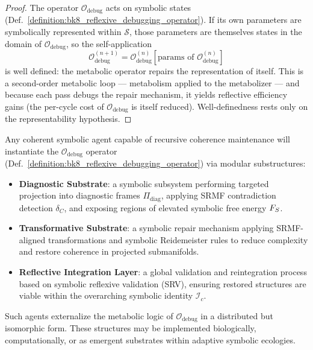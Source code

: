 \begin{proof}
\label{proof:bk8_resursive_self_tuning}
\leavevmode
The operator $\mathcal{O}_{\mathrm{debug}}$ acts on symbolic states (Def.~\ref{definition:bk8_reflexive_debugging_operator}). If its own parameters are symbolically represented within $\mathcal{S}$, those parameters are themselves states in the domain of $\mathcal{O}_{\mathrm{debug}}$, so the self-application
\[
\mathcal{O}^{(n+1)}_{\mathrm{debug}}=\mathcal{O}^{(n)}_{\mathrm{debug}}[\text{params of }\mathcal{O}^{(n)}_{\mathrm{debug}}]
\]
is well defined: the metabolic operator repairs the representation of itself. This is a second-order metabolic loop --- metabolism applied to the metabolizer --- and because each pass debugs the repair mechanism, it yields reflective efficiency gains (the per-cycle cost of $\mathcal{O}_{\mathrm{debug}}$ is itself reduced). Well-definedness rests only on the representability hypothesis.
\end{proof}
\begin{corollary}
\label{corollary:bk8_symbolic_agents_as_projections}
Any coherent symbolic agent capable of recursive coherence maintenance will instantiate the $\mathcal{O}_{\mathrm{debug}}$ operator (Def.~\ref{definition:bk8_reflexive_debugging_operator}) via modular substructures:
\begin{itemize}
    \item \textbf{Diagnostic Substrate}: a symbolic subsystem performing targeted projection into diagnostic frames $\Pi_{\mathrm{diag}}$, applying SRMF contradiction detection $\delta_C$, and exposing regions of elevated symbolic free energy $F_S$.
    \item \textbf{Transformative Substrate}: a symbolic repair mechanism applying SRMF-aligned transformations and symbolic Reidemeister rules to reduce complexity and restore coherence in projected submanifolds.
    \item \textbf{Reflective Integration Layer}: a global validation and reintegration process based on symbolic reflexive validation (SRV), ensuring restored structures are viable within the overarching symbolic identity $\mathscr{I}_c$.
\end{itemize}
Such agents externalize the metabolic logic of $\mathcal{O}_{\mathrm{debug}}$ in a distributed but isomorphic form. These structures may be implemented biologically, computationally, or as emergent substrates within adaptive symbolic ecologies.
\end{corollary}
